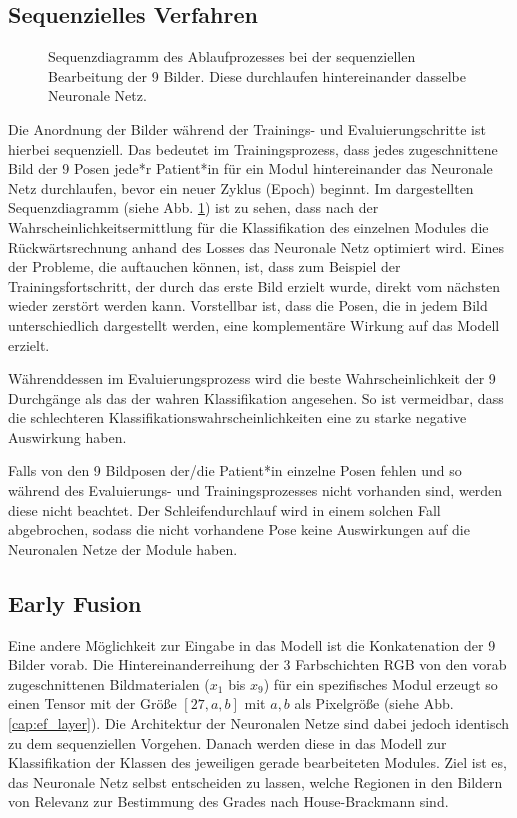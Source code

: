 \subsection{Sequenzielles Verfahren}\label{sequential_method}
\begin{figure}[!b]\centering
\makebox[0pt]{}
\caption[Sequenzdiagramm des Ablaufprozesses bei der sequenziellen Bearbeitung der 9 Bilder]{Sequenzdiagramm des Ablaufprozesses bei der sequenziellen Bearbeitung der 9 Bilder. Diese durchlaufen hintereinander dasselbe Neuronale Netz.}\label{cap:seq}
\end{figure}\label{fig:seq}

Die Anordnung der Bilder während der Trainings- und Evaluierungschritte ist hierbei sequenziell. Das bedeutet im Trainingsprozess, dass jedes zugeschnittene Bild der 9 Posen jede*r Patient*in für ein Modul hintereinander das Neuronale Netz durchlaufen, bevor ein neuer Zyklus (Epoch) beginnt. Im dargestellten Sequenzdiagramm (siehe Abb. \ref{cap:seq}) ist zu sehen, dass nach der Wahrscheinlichkeitsermittlung für die Klassifikation des einzelnen Modules die Rückwärtsrechnung anhand des Losses das Neuronale Netz optimiert wird. Eines der Probleme, die auftauchen können, ist, dass zum Beispiel der Trainingsfortschritt, der durch das erste Bild erzielt wurde, direkt vom nächsten wieder zerstört werden kann. Vorstellbar ist, dass die Posen, die in jedem Bild unterschiedlich dargestellt werden, eine komplementäre Wirkung auf das Modell erzielt.

Währenddessen im Evaluierungsprozess wird die beste Wahrscheinlichkeit der 9 Durchgänge als das der wahren Klassifikation angesehen. So ist vermeidbar, dass die schlechteren Klassifikationswahrscheinlichkeiten eine zu starke negative Auswirkung haben.

Falls von den 9 Bildposen der/die Patient*in einzelne Posen fehlen und so während des Evaluierungs- und Trainingsprozesses nicht vorhanden sind, werden diese nicht beachtet. Der Schleifendurchlauf wird in einem solchen Fall abgebrochen, sodass die nicht vorhandene Pose keine Auswirkungen auf die Neuronalen Netze der Module haben.


\subsection{Early Fusion}\label{earlyfusion_method}
Eine andere Möglichkeit zur Eingabe in das Modell ist die Konkatenation der 9 Bilder vorab. Die Hintereinanderreihung der 3 Farbschichten RGB von den vorab zugeschnittenen Bildmaterialen ($x_1$ bis $x_9$) für ein spezifisches Modul erzeugt so einen Tensor mit der Größe $[27, a, b]$ mit $a, b$ als Pixelgröße (siehe Abb. \ref{cap:ef_layer}). Die Architektur der Neuronalen Netze sind dabei jedoch identisch zu dem sequenziellen Vorgehen. Danach werden diese in das Modell zur Klassifikation der Klassen des jeweiligen gerade bearbeiteten Modules. Ziel ist es, das Neuronale Netz selbst entscheiden zu lassen, welche Regionen in den Bildern von Relevanz zur Bestimmung des Grades nach House-Brackmann sind.

